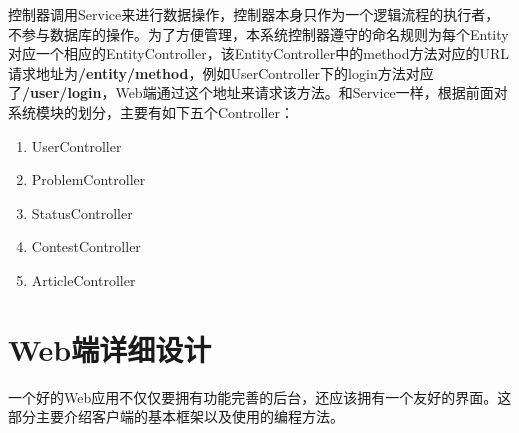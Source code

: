 控制器调用Service来进行数据操作，控制器本身只作为一个逻辑流程的执行者，不参与数据库的操作。为了方便管理，本系统控制器遵守的命名规则为每个Entity对应一个相应的EntityController，该EntityController中的method方法对应的URL请求地址为\textbf{/entity/method}，例如UserController下的login方法对应了\textbf{/user/login}，Web端通过这个地址来请求该方法。和Service一样，根据前面对系统模块的划分，主要有如下五个Controller：
\begin{enumerate}
	\item UserController


	\item ProblemController


	\item StatusController


	\item ContestController
	

	\item ArticleController
	

\end{enumerate}

%
%
%
%
%
%
%
%


\section{Web端详细设计}
一个好的Web应用不仅仅要拥有功能完善的后台，还应该拥有一个友好的界面。这部分主要介绍客户端的基本框架以及使用的编程方法。


